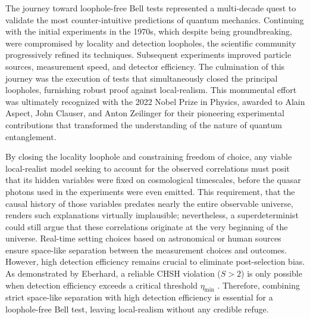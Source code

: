 \documentclass[aps,pra,reprint, superscriptaddress,showkeys]{revtex4-2}
\theoremstyle{plain}
\begin{document}
The journey toward loophole-free Bell tests represented a multi-decade quest to validate the most counter-intuitive predictions of quantum mechanics. Continuing with the initial experiments in the 1970s, which despite being groundbreaking, were compromised by locality and detection loopholes, the scientific community progressively refined its techniques. Subsequent experiments improved particle sources, measurement speed, and detector efficiency. The culmination of this journey was the execution of tests that simultaneously closed the principal loopholes, furnishing robust proof against local-realism. This monumental effort was ultimately recognized with the 2022 Nobel Prize in Physics, awarded to Alain Aspect, John Clauser, and Anton Zeilinger for their pioneering experimental contributions that transformed the understanding of the nature of quantum entanglement.

By closing the locality loophole and constraining freedom of choice, any viable local-realist model seeking to account for the observed correlations must posit that its hidden variables were fixed on cosmological timescales, before the quasar photons used in the experiments were even emitted. This requirement, that the causal history of those variables predates nearly the entire observable universe, renders such explanations virtually implausible; nevertheless, a superdeterminist could still argue that these correlations originate at the very beginning of the universe. Real-time setting choices based on astronomical or human sources ensure space-like separation between the measurement choices and outcomes. However, high detection efficiency remains crucial to eliminate post-selection bias. As demonstrated by Eberhard, a reliable CHSH violation ($S > 2$) is only possible when detection efficiency exceeds a critical threshold $\eta_{\mathrm{min}}$ \cite{Eberhard93}. Therefore, combining strict space-like separation with high detection efficiency is essential for a loophole-free Bell test, leaving local-realism without any credible refuge.


\end{document}
